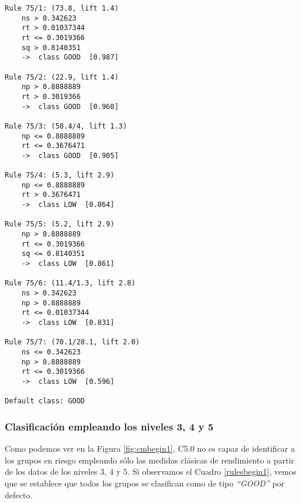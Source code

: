 \begin{tcolorbox}[title=Reglas de clasificación para identificar grupos de tipo \emph{``LOW''}.]
  \makeatletter
  \makeatother
  
 \label{rulesend1}  
  
\begin{multicols}{2}
    \begin{verbatim}
Rule 75/1: (73.8, lift 1.4)
	ns > 0.342623
	rt > 0.01037344
	rt <= 0.3019366
	sq > 0.8140351
	->  class GOOD  [0.987]

Rule 75/2: (22.9, lift 1.4)
	np > 0.8888889
	rt > 0.3019366
	->  class GOOD  [0.960]

Rule 75/3: (50.4/4, lift 1.3)
	np <= 0.8888889
	rt <= 0.3676471
	->  class GOOD  [0.905]

Rule 75/4: (5.3, lift 2.9)
	np <= 0.8888889
	rt > 0.3676471
	->  class LOW  [0.864]

Rule 75/5: (5.2, lift 2.9)
	np > 0.8888889
	rt <= 0.3019366
	sq <= 0.8140351
	->  class LOW  [0.861]

Rule 75/6: (11.4/1.3, lift 2.8)
	ns > 0.342623
	np > 0.8888889
	rt <= 0.01037344
	->  class LOW  [0.831]

Rule 75/7: (70.1/28.1, lift 2.0)
	ns <= 0.342623
	np > 0.8888889
	rt <= 0.3019366
	->  class LOW  [0.596]
	
Default class: GOOD
    \end{verbatim}
  \end{multicols}
\end{tcolorbox}

\subsubsection{Clasificación empleando los niveles 3, 4 y 5}

Como podemos ver en la Figura \ref{fig:cmbegin1}, C5.0 no es capaz de identificar a los grupos en riesgo empleando sólo las medidas clásicas de rendimiento a partir de los datos de los niveles $3$, $4$ y $5$. Si observamos el Cuadro \ref{rulesbegin1}, vemos que se establece que todos los grupos se clasifican como de tipo \emph{``GOOD''} por defecto.

